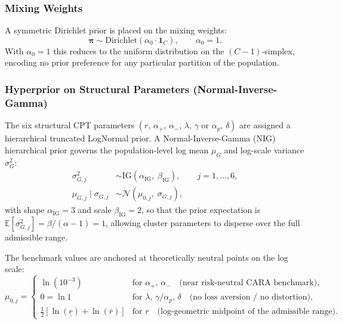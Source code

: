 \documentclass[12pt, a4paper]{article}
\newcommand{\E}{\mathbb{E}}
\newcommand{\Normal}{\mathcal{N}}
\newcommand{\IG}{\mathrm{IG}}
\newcommand{\Dir}{\mathrm{Dirichlet}}
\newcommand{\bpi}{\bm{\pi}}
\begin{document}
\subsubsection{Mixing Weights}

A symmetric Dirichlet prior is placed on the mixing weights:
\begin{equation}
  \bpi \sim \Dir\!\left(\alpha_0 \cdot \mathbf{1}_C\right),
  \qquad \alpha_0 = 1.
  \label{eq:prior_pi}
\end{equation}
With $\alpha_0 = 1$ this reduces to the uniform distribution on the
$(C-1)$-simplex, encoding no prior preference for any particular partition of
the population.

\subsubsection{Hyperprior on Structural Parameters (Normal-Inverse-Gamma)}

The six structural CPT parameters
$(r,\, \alpha_+,\, \alpha_-,\, \lambda,\, \gamma\text{ or }\alpha_p,\, \delta)$
are assigned a hierarchical truncated LogNormal prior.  A Normal-Inverse-Gamma
(NIG) hierarchical prior governs the population-level log mean $\mu_G$ and
log-scale variance $\sigma_G^2$:
\begin{align}
  \sigma_{G,j}^2 &\sim \IG\!\left(\alpha_{\mathrm{IG}},\; \beta_{\mathrm{IG}}\right),
                  \qquad j = 1, \ldots, 6,
  \label{eq:prior_sigma_G}\\
  \mu_{G,j} \mid \sigma_{G,j}
                 &\sim \Normal\!\left(\mu_{0,j},\; \sigma_{G,j}\right),
  \label{eq:prior_mu_G}
\end{align}
with shape $\alpha_{\mathrm{IG}} = 3$ and scale $\beta_{\mathrm{IG}} = 2$, so
that the prior expectation is $\E[\sigma_{G,j}^2] = \beta/(\alpha-1) = 1$,
allowing cluster parameters to disperse over the full admissible range.

The benchmark values are anchored at theoretically neutral points on the
log scale:
\begin{equation}
  \mu_{0,j} =
  \begin{cases}
    \ln(10^{-3}) & \text{for } \alpha_+,\, \alpha_-
                 \quad\text{(near risk-neutral CARA benchmark)}, \\[4pt]
    0 = \ln 1 & \text{for } \lambda,\, \gamma/\alpha_p,\, \delta
                 \quad\text{(no loss aversion / no distortion)}, \\[4pt]
    \tfrac{1}{2}\!\left[\ln(\underline{r}) + \ln(\overline{r})\right]
               & \text{for } r \quad\text{(log-geometric midpoint of the admissible range)}.
  \end{cases}
  \label{eq:mu0}
\end{equation}
\end{document}
